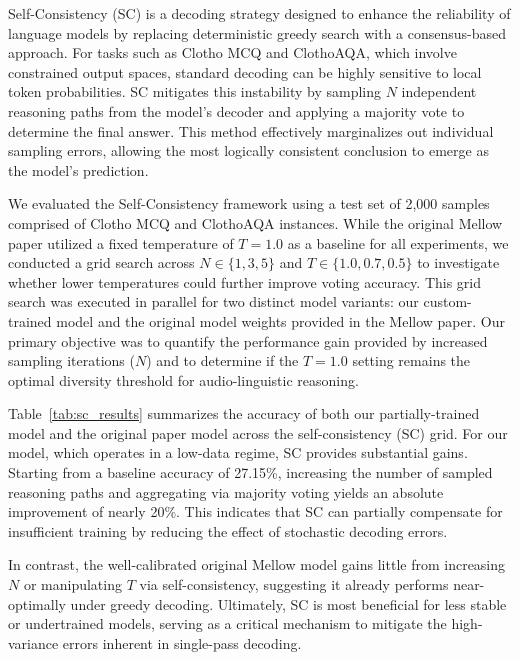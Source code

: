 \documentclass[cameraready]{Interspeech}
\begin{document}
Self-Consistency (SC) is a decoding strategy designed to enhance the reliability of language models by replacing deterministic greedy search with a consensus-based approach. For tasks such as Clotho MCQ and ClothoAQA, which involve constrained output spaces, standard decoding can be highly sensitive to local token probabilities. SC mitigates this instability by sampling $N$ independent reasoning paths from the model's decoder and applying a majority vote to determine the final answer. This method effectively marginalizes out individual sampling errors, allowing the most logically consistent conclusion to emerge as the model's prediction.

We evaluated the Self-Consistency framework using a test set of 2,000 samples comprised of Clotho MCQ and ClothoAQA instances. While the original Mellow paper utilized a fixed temperature of $T=1.0$ as a baseline for all experiments, we conducted a grid search across $N \in \{1, 3, 5\}$ and $T \in \{1.0, 0.7, 0.5\}$ to investigate whether lower temperatures could further improve voting accuracy. This grid search was executed in parallel for two distinct model variants: our custom-trained model and the original model weights provided in the Mellow paper. Our primary objective was to quantify the performance gain provided by increased sampling iterations ($N$) and to determine if the $T=1.0$ setting remains the optimal diversity threshold for audio-linguistic reasoning.

Table~\ref{tab:sc_results} summarizes the accuracy of both our partially-trained model and the original paper model across the self-consistency (SC) grid.
For our model, which operates in a low-data regime, SC provides substantial gains. Starting from a baseline accuracy of 27.15\%, increasing the number of sampled reasoning paths and aggregating via majority voting yields an absolute improvement of nearly 20\%. This indicates that SC can partially compensate for insufficient training by reducing the effect of stochastic decoding errors.

In contrast, the well-calibrated original Mellow model gains little from increasing $N$ or manipulating $T$ via self-consistency, suggesting it already performs near-optimally under greedy decoding. Ultimately, SC is most beneficial for less stable or undertrained models, serving as a critical mechanism to mitigate the high-variance errors inherent in single-pass decoding.
\end{document}
